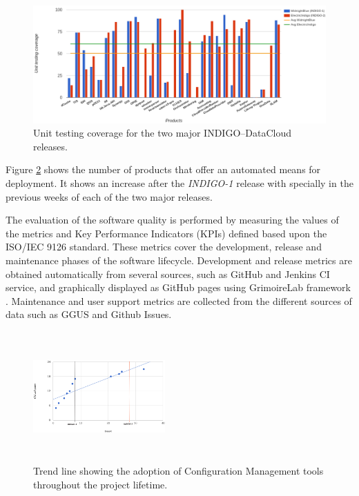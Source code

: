 \documentclass[journal]{IEEEtran}
\begin{document}
\begin{figure}[ht]
\centering
\includegraphics[width=\textwidth]{images/unittest.png}
\caption{Unit testing coverage for the two major INDIGO--DataCloud releases.}
\label{fig:fig_unittest}
\end{figure}

Figure \ref{fig:fig_confman} shows the number of products that offer an automated means
for deployment. It shows an increase after the {\sl INDIGO-1} release with specially
in the previous weeks of each of the two major releases.

The evaluation of the software quality is performed by measuring the values of
the metrics and Key Performance Indicators (KPIs) defined based upon the
ISO/IEC 9126 standard. These metrics cover the development, release and
maintenance phases of the software lifecycle. Development and release metrics
are obtained automatically from several sources, such as GitHub and Jenkins CI
service, and graphically displayed as GitHub pages using GrimoireLab framework
\cite{grimoirelab}. Maintenance and user support metrics are collected from the
different sources of data such as GGUS \cite{ggus} and Github Issues.

\begin{figure}[ht]
\centering
\includegraphics[width=0.45\textwidth, height=50mm]{images/confman.png}
\caption{Trend line showing the adoption of Configuration Management tools throughout the project lifetime.}
\label{fig:fig_confman}
\end{figure}
\end{document}
